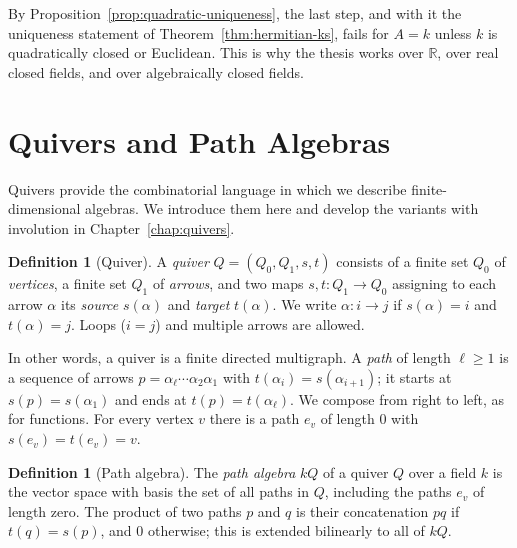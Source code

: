 \documentclass[12pt, a4paper]{report}
\theoremstyle{plain}
\theoremstyle{definition}
\newtheorem{definition}[theorem]{Definition}
\theoremstyle{remark}
\theoremstyle{plain}
\newcommand{\RR}{\mathbb{R}}
\begin{document}
By Proposition~\ref{prop:quadratic-uniqueness}, the last step, and with it the uniqueness statement of Theorem~\ref{thm:hermitian-ks}, fails for $A=k$ unless $k$ is quadratically closed or Euclidean. This is why the thesis works over $\RR$, over real closed fields, and over algebraically closed fields.

\section{Quivers and Path Algebras}
\label{sec:quivers-basic}
Quivers provide the combinatorial language in which we describe finite-dimensional algebras. We introduce them here and develop the variants with involution in Chapter~\ref{chap:quivers}.

\begin{definition}[Quiver]\label{def:quiver}
A \emph{quiver} $Q=(Q_0,Q_1,s,t)$ consists of a finite set $Q_0$ of \emph{vertices}, a finite set $Q_1$ of \emph{arrows}, and two maps $s,t:Q_1\to Q_0$ assigning to each arrow $\alpha$ its \emph{source} $s(\alpha)$ and \emph{target} $t(\alpha)$. We write $\alpha: i\to j$ if $s(\alpha)=i$ and $t(\alpha)=j$. Loops ($i=j$) and multiple arrows are allowed.
\end{definition}

In other words, a quiver is a finite directed multigraph. A \emph{path} of length $\ell\geq1$ is a sequence of arrows $p=\alpha_\ell\cdots\alpha_2\alpha_1$ with $t(\alpha_i)=s(\alpha_{i+1})$; it starts at $s(p)=s(\alpha_1)$ and ends at $t(p)=t(\alpha_\ell)$. We compose from right to left, as for functions. For every vertex $v$ there is a path $e_v$ of length $0$ with $s(e_v)=t(e_v)=v$.

\begin{definition}[Path algebra]\label{def:path-algebra}
The \emph{path algebra} $kQ$ of a quiver $Q$ over a field $k$ is the vector space with basis the set of all paths in $Q$, including the paths $e_v$ of length zero. The product of two paths $p$ and $q$ is their concatenation $pq$ if $t(q)=s(p)$, and $0$ otherwise; this is extended bilinearly to all of $kQ$.
\end{definition}
\end{document}
